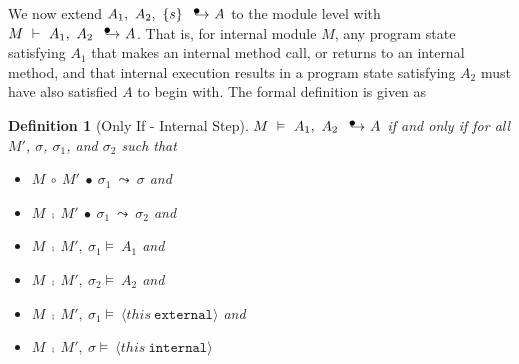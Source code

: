 \documentclass[12pt]{article}
\newcommand\intstep{\hspace{1.5mm}{\raisebox{3pt}{$\bullet$}}\hspace{-1.5mm}{\hookrightarrow}}
\newcommand\oiInternal[3]{#1,\ #2\ \intstep\ #3}
\newcommand\hoareIf[4]{#1,\ #2,\ \{#3\}\ \intstep\ #4}
\newcommand\internal[1]{\langle #1\ \texttt{internal}\rangle}
\newcommand\external[1]{\langle #1\ \texttt{external}\rangle}
\newtheorem{definition}{Definition}
\numberwithin{case}{lemma}
\numberwithin{case}{theorem}
\numberwithin{subcase}{case}
\begin{document}
{%
We now extend $\hoareIf{A_1}{A_2}{s}{A}$ to the module level with
$M\ \vdash\ \oiInternal{A_1}{A_2}{A}$. 
That is, for internal module $M$, any program state satisfying $A_1$
that makes an internal method call, or returns to an internal 
method, and that internal execution results in a program state satisfying $A_2$ 
must have also satisfied $A$ to begin with. The formal definition is
given as
\begin{definition}[Only If - Internal Step]
$M\ \vDash\ \oiInternal{A_1}{A_2}{A}$ if and only if for all $M'$, $\sigma$, $\sigma_1$, and $\sigma_2$ such that 
\begin{itemize}
\item
$M\ \circ\ M'\ \bullet\ \sigma_1\ \leadsto\ \sigma$ and
\item
$M\ \fcmp\ M'\ \bullet\ \sigma_1\ \leadsto\ \sigma_2$ and
\item
$M\ \fcmp\ M',\ \sigma_1 \vDash\ A_1$ and
\item
$M\ \fcmp\ M',\ \sigma_2 \vDash\ A_2$ and
\item
$M\ \fcmp\ M',\ \sigma_1 \vDash\ \external{this}$ and
\item
$M\ \fcmp\ M',\ \sigma \vDash\ \internal{this}$
\end{itemize}

\end{definition}}
\end{document}
